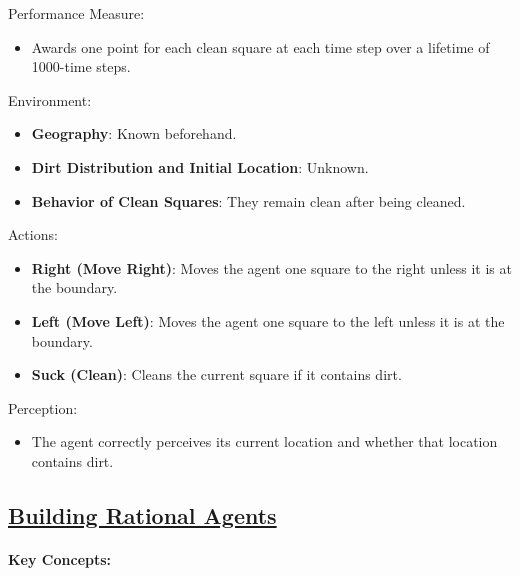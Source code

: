 \documentclass[
]{article}
\begin{document}
Performance Measure:

\begin{itemize}
\item
  Awards one point for each clean square at each time step over a
  lifetime of 1000-time steps.
\end{itemize}

Environment:

\begin{itemize}
\item
  \textbf{Geography}: Known beforehand.
\item
  \textbf{Dirt Distribution and Initial Location}: Unknown.
\item
  \textbf{Behavior of Clean Squares}: They remain clean after being
  cleaned.
\end{itemize}

Actions:

\begin{itemize}
\item
  \textbf{Right (Move Right)}: Moves the agent one square to the right
  unless it is at the boundary.
\item
  \textbf{Left (Move Left)}: Moves the agent one square to the left
  unless it is at the boundary.
\item
  \textbf{Suck (Clean)}: Cleans the current square if it contains dirt.
\end{itemize}

Perception:

\begin{itemize}
\item
  The agent correctly perceives its current location and whether that
  location contains dirt.
\end{itemize}

\subsection{\texorpdfstring{\ul{Building Rational
Agents}}{Building Rational Agents}}\label{building-rational-agents}

\paragraph{Key Concepts:}\label{key-concepts-2}
\end{document}
